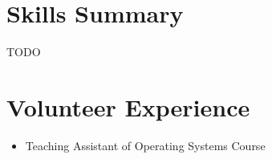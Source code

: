 \documentclass[a4paper,20pt]{article}
\newcommand{\resumeItem}[2]{
  \item\small{
    \textbf{#1}{: #2 \vspace{-2pt}}
  }
}
\newcommand{\resumeSubItem}[2]{\resumeItem{#1}{#2}\vspace{-3pt}}
\newcommand{\resumeSubHeadingListStart}{\begin{itemize}[leftmargin=*, label={}]}
\newcommand{\resumeSubHeadingListEnd}{\end{itemize}}
\begin{document}
\vspace{-5pt}
\section{Skills Summary}
    TODO
\vspace{-5pt}

\vspace{-2pt}
\section{Volunteer Experience}
\begin{itemize}
    \item {Teaching Assistant of Operating Systems Course}
\end{itemize}
\end{document}
